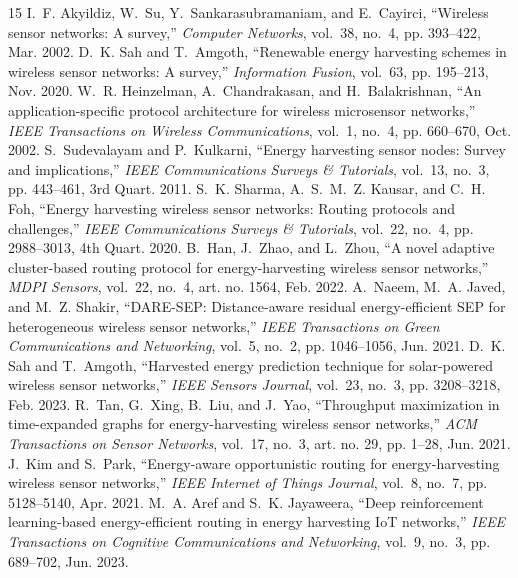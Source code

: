 \documentclass[conference]{IEEEtran}
\begin{document}

\begin{thebibliography}{15}
I.~F. Akyildiz, W.~Su, Y.~Sankarasubramaniam, and E.~Cayirci, ``Wireless sensor networks: A survey,'' \textit{Computer Networks}, vol.~38, no.~4, pp. 393--422, Mar. 2002.
D.~K. Sah and T.~Amgoth, ``Renewable energy harvesting schemes in wireless sensor networks: A survey,'' \textit{Information Fusion}, vol.~63, pp. 195--213, Nov. 2020.
W.~R. Heinzelman, A.~Chandrakasan, and H.~Balakrishnan, ``An application-specific protocol architecture for wireless microsensor networks,'' \textit{IEEE Transactions on Wireless Communications}, vol.~1, no.~4, pp. 660--670, Oct. 2002.
S.~Sudevalayam and P.~Kulkarni, ``Energy harvesting sensor nodes: Survey and implications,'' \textit{IEEE Communications Surveys \& Tutorials}, vol.~13, no.~3, pp. 443--461, 3rd Quart. 2011.
S.~K. Sharma, A.~S.~M.~Z. Kausar, and C.~H. Foh, ``Energy harvesting wireless sensor networks: Routing protocols and challenges,'' \textit{IEEE Communications Surveys \& Tutorials}, vol.~22, no.~4, pp. 2988--3013, 4th Quart. 2020.
B.~Han, J.~Zhao, and L.~Zhou, ``A novel adaptive cluster-based routing protocol for energy-harvesting wireless sensor networks,'' \textit{MDPI Sensors}, vol.~22, no.~4, art. no. 1564, Feb. 2022.
A.~Naeem, M.~A. Javed, and M.~Z. Shakir, ``DARE-SEP: Distance-aware residual energy-efficient SEP for heterogeneous wireless sensor networks,'' \textit{IEEE Transactions on Green Communications and Networking}, vol.~5, no.~2, pp. 1046--1056, Jun. 2021.
D.~K. Sah and T.~Amgoth, ``Harvested energy prediction technique for solar-powered wireless sensor networks,'' \textit{IEEE Sensors Journal}, vol.~23, no.~3, pp. 3208--3218, Feb. 2023.
R.~Tan, G.~Xing, B.~Liu, and J.~Yao, ``Throughput maximization in time-expanded graphs for energy-harvesting wireless sensor networks,'' \textit{ACM Transactions on Sensor Networks}, vol.~17, no.~3, art. no. 29, pp. 1--28, Jun. 2021.
J.~Kim and S.~Park, ``Energy-aware opportunistic routing for energy-harvesting wireless sensor networks,'' \textit{IEEE Internet of Things Journal}, vol.~8, no.~7, pp. 5128--5140, Apr. 2021.
M.~A. Aref and S.~K. Jayaweera, ``Deep reinforcement learning-based energy-efficient routing in energy harvesting IoT networks,'' \textit{IEEE Transactions on Cognitive Communications and Networking}, vol.~9, no.~3, pp. 689--702, Jun. 2023.

\end{thebibliography}
\end{document}

